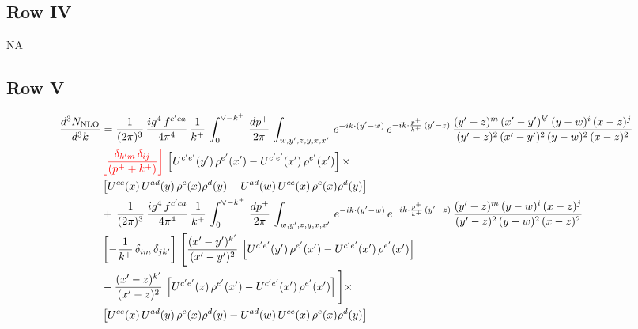 \documentclass[9pt]{article}
\numberwithin{equation}{section}
\newcommand{\chg}[1]{{\color{red}#1}}
\begin{document}
\subsection{Row IV}
\textsc{NA}
\subsection{Row V}
\begin{align}
    \frac{d^{3}N_{\rm NLO}}{d^{3}k} & =  \frac{1}{(2\pi)^{3}}\, \frac{ig^{4}\,f^{c'ca}}{4\pi^{4}}\, \frac{1}{k^{+}}\,\int_{0}^{\vee-k^{+}}\, \frac{dp^{+}}{2\pi}\, \int_{w,y',z,y,x,x'}\, e^{-ik\cdot (y'-w)}\, e^{-ik\cdot \frac{p^{+}}{k^{+}}\,(y'-z)}\,\frac{(y'-z)^{m}\,(x'-y')^{k'}\,(y-w)^{i}\,(x-z)^{j}}{(y'-z)^{2}\,(x'-y')^{2}\,(y-w)^{2}\,(x-z)^{2}}\notag \\ & \chg{\left[\frac{\delta_{k'm}\,\delta_{ij}}{(p^{+}+k^{+})}\right]}\, \left[U^{c'e'}(y')\,\rho^{e'}(x')-U^{c'e'}(x')\,\rho^{e'}(x')\right]\times \notag \\ &  \left[U^{ce}(x)\,U^{ad}(y)\,\rho^{e}(x)\rho^{d}(y)-U^{ad}(w)\,U^{ce}(x)\,\rho^{e}(x)\rho^{d}(y)\right] \notag \\
&   +\,\frac{1}{(2\pi)^{3}}\, \frac{ig^{4}\,f^{c'ca}}{4\pi^{4}}\, \frac{1}{k^{+}}\,\int_{0}^{\vee-k^{+}}\, \frac{dp^{+}}{2\pi}\, \int_{w,y',z,y,x,x'}\, e^{-ik\cdot (y'-w)}\, e^{-ik\cdot \frac{p^{+}}{k^{+}}\,(y'-z)}\,\frac{(y'-z)^{m}\,(y-w)^{i}\,(x-z)^{j}}{(y'-z)^{2}\,(y-w)^{2}\,(x-z)^{2}}\notag \\ &   \left[-\frac{1}{k^{+}}\, \delta_{im}\, \delta_{jk'}\right]\, \Bigg[\frac{(x'-y')^{k'}}{(x'-y')^{2}}\,\left[U^{c'e'}(y')\,\rho^{e'}(x')-U^{c'e'}(x')\,\rho^{e'}(x')\right]\notag \\ & -\frac{(x'-z)^{k'}}{(x'-z)^{2}}\,\left[U^{c'e'}(z)\,\rho^{e'}(x')-U^{c'e'}(x')\,\rho^{e'}(x')\right]\Bigg]\times \notag \\ &    \left[U^{ce}(x)\,U^{ad}(y)\,\rho^{e}(x)\rho^{d}(y)-U^{ad}(w)\,U^{ce}(x)\,\rho^{e}(x)\rho^{d}(y)\right]
\end{align}
\end{document}
